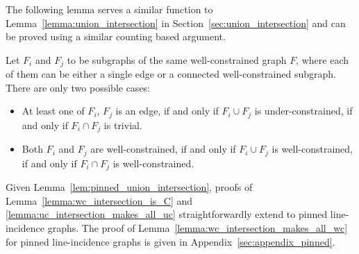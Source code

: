 The following lemma serves a similar function to Lemma~\ref{lemma:union_intersection} in Section~\ref{sec:union_intersection}
and can be proved using a similar counting based argument.


\begin{lemma}
\label{lem:pinned_union_intersection}
Let $F_i$ and $F_j$ to be subgraphs of the same well-constrained graph $F$,
where each of them can be either  a single edge or a connected well-constrained subgraph.
There are only two possible cases:
\begin{itemize}
\item At least one of $F_i$, $F_j$ is an edge, if and only if $F_i \cup F_j$ is under-constrained, if and only if $F_i \cap F_j$ is trivial.
\item Both $F_i$ and $F_j$ are well-constrained, if and only if $F_i \cup F_j$ is well-constrained, if and only if $F_i \cap F_j$ is well-constrained.
\end{itemize}
\end{lemma}

Given Lemma~\ref{lem:pinned_union_intersection}, %
proofs of Lemma~\ref{lemma:wc_intersection_is_C} and \ref{lemma:uc_intersection_makes_all_uc} straightforwardly extend to  pinned line-incidence graphs.
The proof of Lemma~\ref{lemma:wc_intersection_makes_all_wc} for pinned line-incidence graphs 
is given in Appendix~\ref{sec:appendix_pinned}.

